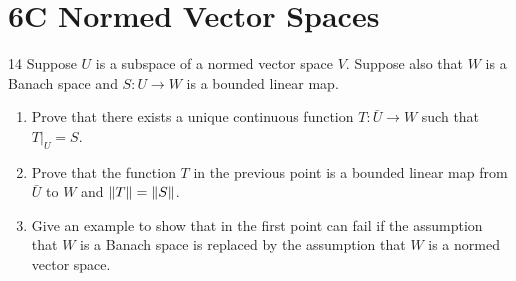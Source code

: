 \section{6C Normed Vector Spaces}


\begin{exercise}{14}
Suppose $U$ is a subspace of a normed vector space $V$.
Suppose also that $W$ is a Banach space and $S: U \to W$ is a bounded linear map.
\begin{enumerate}
    \item Prove that there exists a unique continuous function $T: \bar{U} \to W$ such that $T|_U = S$.
    \item Prove that the function $T$ in the previous point is a bounded linear map from $\bar{U}$ to $W$ and $\left\lVert T\right\rVert = \left\lVert S\right\rVert$.
    \item Give an example to show that in the first point can fail if the assumption that $W$ is a Banach space is replaced by the assumption that $W$ is a normed vector space.
\end{enumerate}
\end{exercise}
